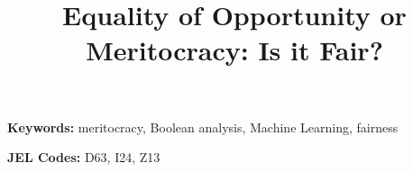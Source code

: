 \documentclass[english,11pt,a4paper]{article}
\theoremstyle{definition}
\begin{document}
\title{Equality of Opportunity or Meritocracy: Is it Fair?}
\author{}
\date{}
\maketitle

\begin{abstract}
	\noindent
	
\end{abstract}

\vspace{1em}
\noindent\textbf{Keywords:} meritocracy, Boolean analysis, Machine Learning, fairness

\vspace{0.5em}
\noindent\textbf{JEL Codes:} D63, I24, Z13
	

\end{document}
